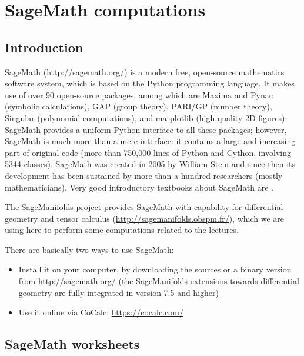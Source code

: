 \chapter{SageMath computations} \label{s:sam}

\minitoc

\section{Introduction}


\textsf{SageMath} (\url{http://sagemath.org/}) is a modern free,
open-source mathematics software system, which is
based on the Python programming language. It makes use of over 90 open-source packages,
among which are \textsf{Maxima} and \textsf{Pynac} (symbolic calculations),
\textsf{GAP} (group theory),
\textsf{PARI/GP} (number theory), \textsf{Singular} (polynomial computations),
and \textsf{matplotlib} (high quality 2D figures).
\textsf{SageMath} provides a uniform Python interface to all these packages; however,
\textsf{SageMath} is much more than a mere interface: it contains a large and increasing part of
original code (more than 750,000 lines of Python and Cython, involving 5344 classes).
\textsf{SageMath} was created in 2005 by William Stein \cite{SteinJ05} and since
then its development has been sustained by more than a hundred researchers
(mostly mathematicians). Very good introductory textbooks about \textsf{SageMath} are
\cite{JoyneS14,Zimme13,Bard15}.

The \textsf{SageManifolds} project
provides \textsf{SageMath} with capability for differential geometry and tensor calculus
(\url{http://sagemanifolds.obspm.fr/}), which we are using here to perform
some computations related to the lectures.

There are basically two ways to use \textsf{SageMath}:
\begin{itemize}
\item Install it on your computer, by downloading the sources or a binary version
from \url{http://sagemath.org/} (the \textsf{SageManifolds} extensions towards
differential geometry are fully integrated in version 7.5 and higher)
\item Use it online via \textsf{CoCalc}: \url{https://cocalc.com/}
\end{itemize}

\section{SageMath worksheets} \label{s:sam:worksheets}

